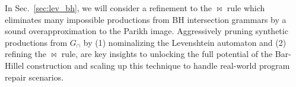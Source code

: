 \documentclass[runningheads]{llncs}
\begin{document}
%
%

In Sec.~\ref{sec:lev_bh}, we will consider a refinement to the $\Join$ rule which eliminates many impossible productions from BH intersection grammars by a sound overapproximation to the Parikh image. Aggressively pruning synthetic productions from $G_\cap$ by (1) nominalizing the Levenshtein automaton and (2) refining the $\Join$ rule, are key insights to unlocking the full potential of the Bar-Hillel construction and scaling up this technique to handle real-world program repair scenarios.
\end{document}
